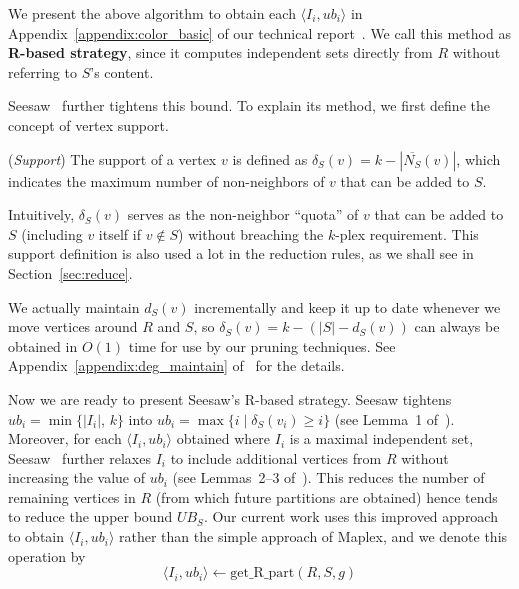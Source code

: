 \documentclass[sigconf, nonacm]{acmart}
\begin{document}
\vspace{1mm}
 We present the above algorithm to obtain each $\langle I_i, ub_i\rangle$ in Appendix~\ref{appendix:color_basic} of our technical report~\cite{tech_report}. We call this method as {\bf R-based strategy}, since it computes independent sets directly from $R$ without referring to $S$'s content.

Seesaw~\cite{seesaw} further tightens this bound. To explain its method, we first define the concept of vertex support.

\vspace{-0.5mm}
\begin{definition}(\emph{Support})\label{def:support}
    The support of a vertex $v$ is defined as  $\delta_S(v)=k-|\overline{N_S}(v)|$, which indicates the maximum number of non-neighbors of $v$ that can be added to $S$.
\end{definition}
\vspace{-0.5mm}

Intuitively, $\delta_S(v)$ serves as the non-neighbor ``quota'' of $v$ that can be added to $S$ (including $v$ itself if $v\notin S$) without breaching the $k$-plex requirement. %
This support definition is also used a lot in the reduction rules, as we shall see in Section~\ref{sec:reduce}.

We actually maintain $d_S(v)$ incrementally and keep it up to date whenever we move vertices around $R$ and $S$, so $\delta_S(v)=k-(|S|-d_S(v))$ can always be obtained in $O(1)$ time for use by our pruning techniques. See Appendix~\ref{appendix:deg_maintain} of~\cite{tech_report} for the details.

Now we are ready to present Seesaw's R-based strategy. Seesaw tightens $ub_i=\min\{|I_i|$, $k\}$ into $ub_i=\max\{i\mid\delta_S(v_i)\ge i\}$ (see Lemma~1 of~\cite{seesaw}). 
Moreover, for each $\langle I_i, ub_i\rangle$ obtained where $I_i$ is a maximal independent set, Seesaw~\cite{seesaw} further relaxes $I_i$ to include additional vertices from $R$ without increasing the value of $ub_i$ (see Lemmas~2--3 of~\cite{seesaw}). This reduces the number of remaining vertices in $R$ (from which future partitions are obtained) hence tends to reduce the upper bound $UB_S$. Our current work uses this improved approach to obtain $\langle I_i, ub_i\rangle$ rather than the simple approach of Maplex, and we denote this operation by
\vspace{-1mm}
$$\langle I_i, ub_i\rangle\gets \text{get\_R\_part}(R, S, g)$$
\vspace{-4mm}
\end{document}
